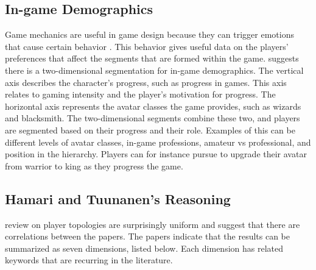 \documentclass[../Main.tex]{subfiles}
\begin{document}
\subsection{In-game Demographics}
Game mechanics are useful in game design because they can trigger emotions that cause certain behavior \citep{lazzaro_four_2008}. This behavior gives useful data on the players’ preferences that affect the segments that are formed within the game. \citet{hamari_game_2010} suggests there is a two-dimensional segmentation for in-game demographics. The vertical axis describes the character’s progress, such as progress in games. This axis relates to gaming intensity and the player’s motivation for progress.
The horizontal axis represents the avatar classes the game provides, such as wizards and blacksmith. The two-dimensional segments combine these two, and players are segmented based on their progress and their role. Examples of this can be different levels of avatar classes, in-game professions, amateur vs professional, and position in the hierarchy. Players can for instance pursue to upgrade their avatar from warrior to king as they progress the game. 


\subsection{Hamari and Tuunanen’s Reasoning}
\citet{hamari_player_2014} review on player topologies are surprisingly uniform and suggest that there are correlations between the papers. The papers indicate that the results can be summarized as seven dimensions, listed below. Each dimension has related keywords that are recurring in the literature.
\end{document}
